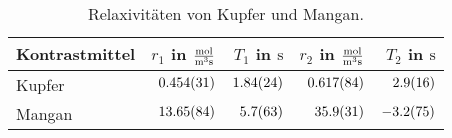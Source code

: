 \begin{table}[H]
    \centering
    \caption{Relaxivitäten von Kupfer und Mangan.}
    \begin{tabular}{|l||r|r|r|r|} \hline
        Kontrastmittel & $r_{1}$ in $\si{\frac{\mol}{\metre \cubed \second}}$    &  $T_{1}$ in $\si{\second}$ & $r_{2}$ in $\si{\frac{\mol}{\metre \cubed \second}}$ & $T_{2}$ in $\si{\second}$  \\ \hline \hline
        Kupfer & $\SI{0.454 \pm 0.031}{}$   & $\SI{1.84 \pm 0.24}{}$    & $\SI{0.617 \pm 0.084}{}$   & $\SI{2.9  \pm 1.6}{}$ \\ \hline
        Mangan & $\SI{13.65 \pm 0.84}{}$    & $\SI{5.7 \pm 6.3}{}$      & $\SI{35.9 \pm 3.1}{}$  & $\SI{-3.2 \pm 7.5}{}$ \\ \hline
    \end{tabular} 
    \label{tab:Relaxivitat} 
\end{table}
    

